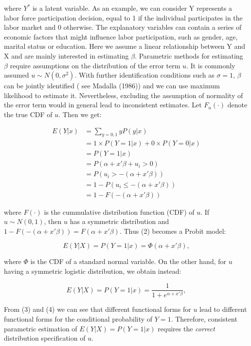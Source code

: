 \documentclass[a4paper]{article}
\begin{document}
where $Y^*$ is a latent variable.
As an example, we can consider Y represents a labor force participation decision, equal to 1 if the individual participates in the labor market and 0 otherwise. The explanatory variables can contain a series of economic factors that might influence labor participation, such as gender, age, marital status or education. Here we assume a linear relationship between Y and X and are mainly interested in estimating $\beta$.
Parametric methods for estimating $\beta$ require assumptions on the distribution of the error term $u$. It is commonly assumed $ u \sim N(0, \sigma^2)$. With further identification conditions such as $\sigma = 1$, $\beta$ can be jointly identified ( see Madalla (1986)) and we can use maximum likelihood to estimate it. Nevertheless, excluding the assumption of normality of the error term would in general lead to inconsistent estimates. Let $F_u(\cdot)$ denote the true CDF of $u$. Then we get:


\[ 
\begin{split}
E(Y|x) & = \sum_{y=0,1} yP(y|x) \\
 & = 1 \times P(Y=1|x) + 0 \times P(Y=0|x) \\
 & = P(Y=1|x) \\ 
 & = P(\alpha + x'\beta + u_i > 0) \\
 & = P(u_i > -(\alpha + x'\beta)) \\
 & = 1 - P(u_i \leq -(\alpha + x'\beta)) \\
 & = 1 - F(-(\alpha + x'\beta))
\end{split}
\]

where $F(\cdot)$ is the cummulative distribution function (CDF) of $u$. If $ u \sim N(0,1)$, then $u$ has a symmetric distribution and $1 - F(-(\alpha + x'\beta)) = F(\alpha + x'\beta)$. Thus (2) becomes a Probit model:

\begin{equation}
E(Y|X) = P(Y=1|x) = \Phi(\alpha + x'\beta),
\end{equation}

where $\Phi$ is the CDF of a standard normal variable. On the other hand, for $u$ having a symmetric logistic distribution, we obtain instead:

\begin{equation}
E(Y|X) = P(Y=1|x) = \frac{1}{1 + e^{\alpha + x'\beta}},
\end{equation}

\vspace{5mm} 

From (3) and (4) we can see that different functional forms for $u$ lead to different functional forms for the conditional probability of $Y = 1$. Therefore, consistent parametric estimation of $E(Y|X) = P(Y=1|x)$ requires the \textit{correct} distribution specification of $u$. 
\end{document}
